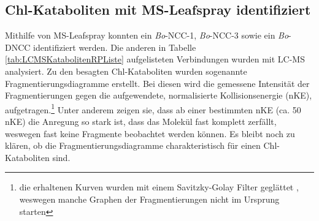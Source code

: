 \documentclass[12pt,a4paper]{article}
\begin{document}
\subsection{Chl-Kataboliten mit MS-Leafspray identifiziert}

Mithilfe von MS-Leafspray konnten ein \textit{Bo}-NCC-1, \textit{Bo}-NCC-3 sowie ein \textit{Bo}-DNCC identifiziert werden. Die anderen in Tabelle \ref{tab:LCMSKatabolitenRPListe} aufgelisteten Verbindungen wurden mit LC-MS analysiert. Zu den besagten Chl-Kataboliten wurden sogenannte Fragmentierungsdiagramme erstellt. Bei diesen wird die gemessene Intensität der Fragmentierungen gegen die aufgewendete, normalisierte Kollisionsenergie (nKE), aufgetragen.\footnote{die erhaltenen Kurven wurden mit einem Savitzky-Golay Filter geglättet \cite{scipy}, weswegen manche Graphen der Fragmentierungen nicht im Ursprung starten} Unter anderem zeigen sie, dass ab einer bestimmten nKE (ca. 50 nKE) die Anregung so stark ist, dass das Molekül fast komplett zerfällt, weswegen fast keine Fragmente beobachtet werden können. Es bleibt noch zu klären, ob die Fragmentierungsdiagramme charakteristisch für einen Chl-Kataboliten sind. 
\end{document}
